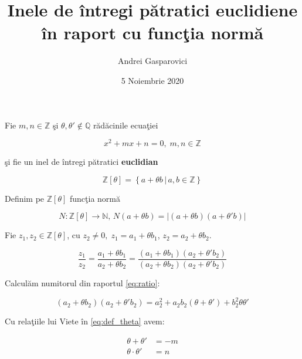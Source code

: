 \documentclass[12pt]{article}
\title{Inele de întregi pătratici euclidiene în raport cu funcţia normă}
\author{Andrei Gasparovici}
\date{5 Noiembrie 2020}
\begin{document}
\maketitle

Fie $m, n \in \mathbb{Z}$ şi $\theta, \theta' \notin \mathbb{Q}$ rădăcinile ecuaţiei

\begin{equation} \label{eq:def_theta}
    x^2 + mx + n = 0, \; m, n \in \mathbb{Z}
\end{equation}

şi fie un inel de întregi pătratici \textbf{euclidian}

\begin{equation} \label{eq:def_z_theta}
    \mathbb{Z}[\theta] = \left\{ a + \theta b \,|\, a, b \in \mathbb{Z}\right\}
\end{equation}

Definim pe $\mathbb{Z[\theta]}$ funcţia normă

\begin{equation} \label{eq:def_norm}
    N : \mathbb{Z[\theta]} \to \mathbb{N}, \, N(a + \theta b) = |(a + \theta b)(a + \theta' b)|
\end{equation}

Fie $z_1, z_2 \in \mathbb{Z}[\theta]$, cu $z_2 \neq 0, \; z_1 = a_1 + \theta b_1$, $z_2 = a_2 + \theta b_2$.

\begin{equation} \label{eq:ratio}
    \frac{z_1}{z_2} = \frac{a_1 + \theta b_1}{a_2 + \theta b_2} = 
    \frac{(a_1 + \theta b_1)(a_2 + \theta' b_2)}{(a_2 + \theta b_2)(a_2 + \theta' b_2)}
\end{equation}

Calculăm numitorul din raportul \eqref{eq:ratio}:

\begin{equation} \label{eq:ratio_denominator}
    (a_2 + \theta b_2)(a_2 + \theta' b_2) = a_2^2 + a_2b_2(\theta + \theta') + b_2^2\theta\theta'
\end{equation}

Cu relaţiile lui Viete în \eqref{eq:def_theta} avem:

\begin{equation} \label{eq:viete}
    \begin{array}{ll}
    \theta + \theta' &= -m \\
    \theta \cdot \theta' &= n \\
    \end{array}
\end{equation}
\end{document}
